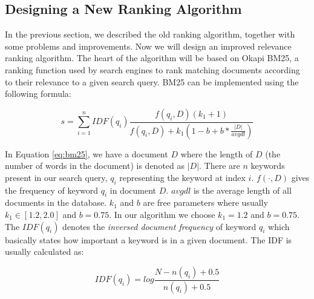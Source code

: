 \subsection{Designing a New Ranking Algorithm}
In the previous section, we described the old ranking algorithm, together with some problems and improvements. Now we will design an improved relevance ranking algorithm. The heart of the algorithm will be based on Okapi BM25, a ranking function used by search engines to rank matching documents according to their relevance to a given search query\cite{jones2000probabilistic}. BM25 can be implemented using the following formula:

\begin{equation}
\label{eq:bm25}
s = \sum_{i=1}^{n} IDF(q_i) \frac{f(q_i, D)(k_1 + 1)}{f(q_i, D) + k_1 (1 - b + b * \frac{|D|}{avgdl})}
\end{equation}

In Equation \ref{eq:bm25}, we have a document $ D $ where the length of $ D $ (the number of words in the document) is denoted as $ |D| $. There are $ n $ keywords present in our search query, $ q_i $ representing the keyword at index $ i $. $ f(\cdot, D) $ gives the frequency of keyword $ q_i $ in document $ D $. $ avgdl $ is the average length of all documents in the database. $ k_1 $ and $ b $ are free parameters where usually $ k_1  \in [1.2,2.0] $ and $ b = 0.75 $. In our algorithm we choose $ k_1 = 1.2 $ and $ b = 0.75 $. The $ IDF(q_i) $ denotes the \emph{inversed document frequency} of keyword $ q_i $ which basically states how important a keyword is in a given document. The IDF is usually calculated as:

\begin{equation}
\label{eq:bm25-idf}
IDF(q_i) = log\frac{N - n(q_i) + 0.5}{n(q_i) + 0.5}
\end{equation}

